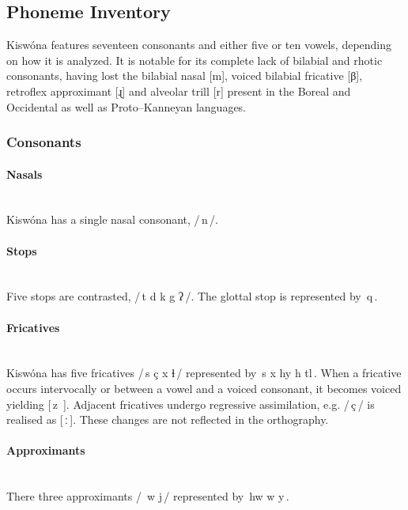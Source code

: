 \documentclass[11pt,a4paper,titlepage]{article}
\newcommand\phoneme[1]{/\,#1\,/}
\newcommand\phone[1]{[\,#1\,]}
\newcommand\orth[1]{\textlangle\,#1\,\textrangle}
\newcommand\gstop{ʔ}
\newcommand\textlong{ː}
\newcommand\tl{ɬ}
\begin{document}
		\subsection{Phoneme Inventory}
			Kisw\'ona features seventeen consonants and either five or ten vowels, depending on how it is analyzed. It is notable for its complete lack of bilabial and rhotic consonants, having lost the bilabial nasal [m], voiced bilabial fricative [β], retroflex approximant [ɻ] and alveolar trill [r] present in the Boreal and Occidental as well as Proto–Kanneyan languages.		
											
			\subsubsection{Consonants}
						
				\paragraph{Nasals} ~\\
					Kisw\'ona has a single nasal consonant, \phoneme{n}.
							
				\paragraph{Stops} ~\\
					Five stops are contrasted, \phoneme{t d k g \gstop}. The glottal stop is represented by \orth{q}.
							
				\paragraph{Fricatives} ~\\
					Kisw\'ona has five fricatives \phoneme{s \esh{} \c{c} x \tl} represented by \orth{s x hy h tl}. When a fricative occurs intervocally or between a vowel and a voiced consonant, it becomes voiced yielding \phone{z }. Adjacent fricatives undergo regressive assimilation, e.g. \phoneme{\c{c}\esh{}} is realised as \phone{\esh{}\textlong}. These changes are not reflected in the orthography.
							
				\paragraph{Approximants} ~\\
					There three approximants \phoneme{\textturnw{} w j} represented by \orth{hw w y}.
			
\end{document}
